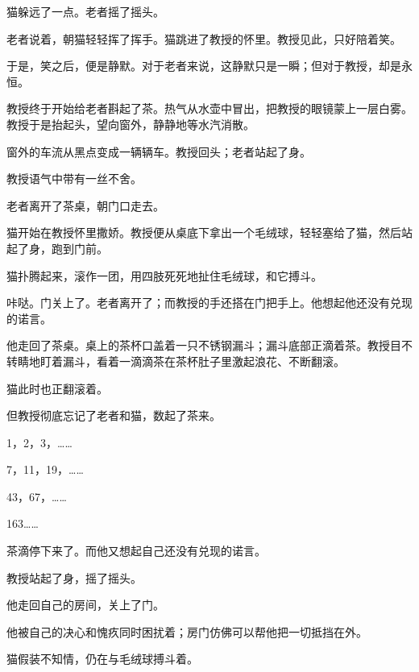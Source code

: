 猫躲远了一点。老者摇了摇头。

老者说着，朝猫轻轻挥了挥手。猫跳进了教授的怀里。教授见此，只好陪着笑。

于是，笑之后，便是静默。对于老者来说，这静默只是一瞬；但对于教授，却是永恒。

教授终于开始给老者斟起了茶。热气从水壶中冒出，把教授的眼镜蒙上一层白雾。教授于是抬起头，望向窗外，静静地等水汽消散。

窗外的车流从黑点变成一辆辆车。教授回头；老者站起了身。

教授语气中带有一丝不舍。

老者离开了茶桌，朝门口走去。

猫开始在教授怀里撒娇。教授便从桌底下拿出一个毛绒球，轻轻塞给了猫，然后站起了身，跑到门前。

猫扑腾起来，滚作一团，用四肢死死地扯住毛绒球，和它搏斗。

咔哒。门关上了。老者离开了；而教授的手还搭在门把手上。他想起他还没有兑现的诺言。

他走回了茶桌。桌上的茶杯口盖着一只不锈钢漏斗；漏斗底部正滴着茶。教授目不转睛地盯着漏斗，看着一滴滴茶在茶杯肚子里激起浪花、不断翻滚。

猫此时也正翻滚着。

但教授彻底忘记了老者和猫，数起了茶来。

1，2，3，……

7，11，19，……

43，67，……

163……

茶滴停下来了。而他又想起自己还没有兑现的诺言。

教授站起了身，摇了摇头。

他走回自己的房间，关上了门。

他被自己的决心和愧疚同时困扰着；房门仿佛可以帮他把一切抵挡在外。

猫假装不知情，仍在与毛绒球搏斗着。







